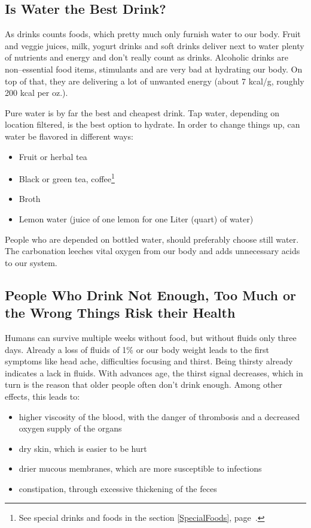 \documentclass[../main.tex]{subfiles}
\begin{document}
  \subsection{Is Water the Best Drink?}

  As drinks counts foods, which pretty much only furnish water to our body. 
  Fruit and veggie juices, milk, yogurt drinks and soft drinks deliver next to water plenty of nutrients and energy and  don't really count as drinks.
  Alcoholic drinks are non--essential food items, stimulants and are very bad at hydrating our body.
  On top of that, they are delivering a lot of unwanted energy (about 7 kcal/g, roughly 200 kcal per oz.).

  
  Pure water is by far the best and cheapest drink. Tap water, depending on location filtered, is the best option to hydrate.
  In order to change things up, can water be flavored in different ways:
  \begin{itemize}
  \item Fruit or herbal tea
  \item Black or green tea, coffee\footnote{See special drinks and foods in the section \ref{SpecialFoods}, page~\pageref{SpecialFoods}.}
  \item Broth
    \item Lemon water (juice of one lemon for one Liter (quart) of water)
  \end{itemize}

  People who are depended on bottled water, should preferably choose still water.
  The carbonation leeches vital oxygen from our body and adds unnecessary acids to our system.

  \subsection[Drinking Too Little, Too Much or the Wrong Drinks]{People Who Drink Not Enough, Too Much or the Wrong Things Risk their Health}

  Humans can survive multiple weeks without food, but without fluids only three days.
  Already a loss of fluids of 1\% or our body weight leads to the first symptoms like head ache, difficulties focusing and thirst.
  Being thirsty already indicates a lack in fluids.
  With advances age, the thirst signal decreases, which in turn is the reason that older people often don't drink enough.
  Among other effects, this leads to:
  \begin{itemize}
  \item higher viscosity of the blood, with the danger of thrombosis and a decreased oxygen supply of the organs
  \item dry skin, which is easier to be hurt
  \item drier mucous membranes, which are more susceptible to infections
    \item constipation, through excessive thickening of the feces
    \end{itemize}
\end{document}
